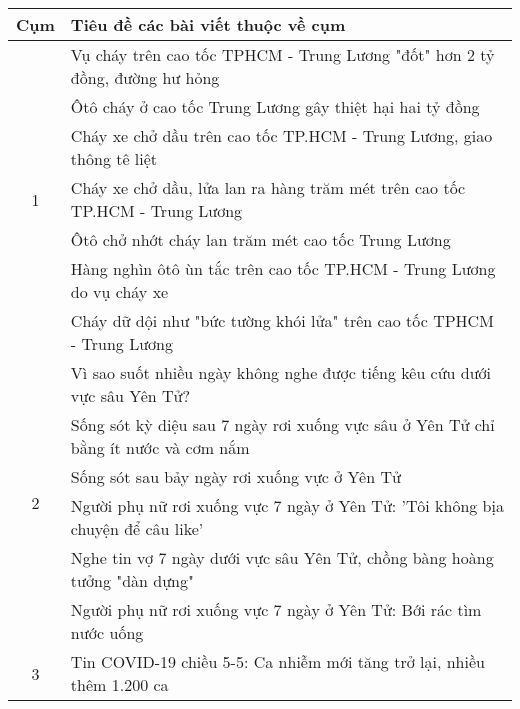\begin{table}[ht!]
    \centering
    \small
\begin{tabular}{|c|l|}
\hline
\multicolumn{1}{|l|}{\textbf{Cụm}} & \textbf{Tiêu đề các bài viết thuộc về cụm}                                         \\ \hline
\multirow{7}{*}{1}                 & Vụ cháy trên cao tốc TPHCM - Trung Lương "đốt" hơn 2 tỷ đồng, đường hư hỏng        \\
                                   & Ôtô cháy ở cao tốc Trung Lương gây thiệt hại hai tỷ đồng                           \\
                                   & Cháy xe chở dầu trên cao tốc TP.HCM - Trung Lương, giao thông tê liệt              \\
                                   & Cháy xe chở dầu, lửa lan ra hàng trăm mét trên cao tốc TP.HCM - Trung Lương        \\
                                   & Ôtô chở nhớt cháy lan trăm mét cao tốc Trung Lương                                 \\
                                   & Hàng nghìn ôtô ùn tắc trên cao tốc TP.HCM - Trung Lương do vụ cháy xe              \\
                                   & Cháy dữ dội như "bức tường khói lửa" trên cao tốc TPHCM - Trung Lương              \\ \hline
\multirow{6}{*}{2}                 & Vì sao suốt nhiều ngày không nghe được tiếng kêu cứu dưới vực sâu Yên Tử?          \\
                                   & Sống sót kỳ diệu sau 7 ngày rơi xuống vực sâu ở Yên Tử chỉ bằng ít nước và cơm nắm \\
                                   & Sống sót sau bảy ngày rơi xuống vực ở Yên Tử                                       \\
                                   & Người phụ nữ rơi xuống vực 7 ngày ở Yên Tử: 'Tôi không bịa chuyện để câu like'     \\
                                   & Nghe tin vợ 7 ngày dưới vực sâu Yên Tử, chồng bàng hoàng tưởng "dàn dựng"          \\
                                   & Người phụ nữ rơi xuống vực 7 ngày ở Yên Tử: Bới rác tìm nước uống                  \\ \hline
\multirow{7}{*}{3}                 & Tin COVID-19 chiều 5-5: Ca nhiễm mới tăng trở lại, nhiều thêm 1.200 ca             \\

\end{tabular}
\end{table}

